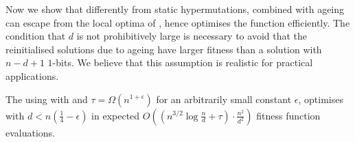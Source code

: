 \documentclass[lettersize,journal]{IEEEtran}
\begin{document}
% 
Now we show that differently from static hypermutations, {\expoHD }
combined with ageing can escape from the local optima of \cliff, 
hence optimises the function efficiently. The condition that $d$ is not prohibitively large is necessary to avoid
that the reinitialised solutions due to ageing have larger fitness than a solution with $n-d+1$ $1$-bits.
We believe that this assumption is realistic for practical applications.

\begin{theorem}\label{thm:cliffexpo}
The {\oneoneOPTIA } using \IPHfcm{} with {\expoHD } and $\tau=\Omega(n^{1+\epsilon})$ 
for 
an arbitrarily small constant $\epsilon$,  optimises \cliff{} with 
$d<n(\frac{1}{4}-\epsilon)$ in expected {\color{blue} $O\left( \left(n^{3/2}\log{\frac{n}{d}}+\tau \right)\cdot \frac{n^2}{d^2}\right)$ }
 fitness function evaluations. 
\end{theorem}
\end{document}
